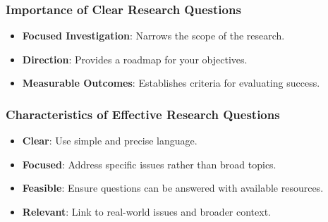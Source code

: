 \documentclass[aspectratio=169]{beamer}
\begin{document}
\begin{frame}[fragile]
    \frametitle{Importance of Clear Research Questions}
    \begin{itemize}
        \item \textbf{Focused Investigation}: Narrows the scope of the research.
        \item \textbf{Direction}: Provides a roadmap for your objectives.
        \item \textbf{Measurable Outcomes}: Establishes criteria for evaluating success.
    \end{itemize}
\end{frame}

\begin{frame}[fragile]
    \frametitle{Characteristics of Effective Research Questions}
    \begin{itemize}
        \item \textbf{Clear}: Use simple and precise language.
        \item \textbf{Focused}: Address specific issues rather than broad topics.
        \item \textbf{Feasible}: Ensure questions can be answered with available resources.
        \item \textbf{Relevant}: Link to real-world issues and broader context.
    \end{itemize}
\end{frame}
\end{document}
